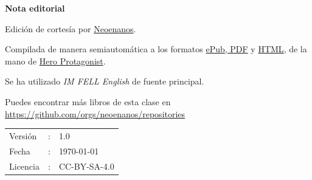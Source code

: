 \begin{center}
  {\LARGE\textbf{Nota editorial}}
\end{center}

\bigskip

Edición de cortesía por \href{https://github.com/orgs/neoenanos/}{Neoenanos}.

\medskip

Compilada de manera semiautomática a los formatos \href{https://github.com/neoenanos/elella/releases}{ePub, PDF} y \href{https://elella.netlify.app}{HTML}, de la mano de \href{https://heroprotagonist.is-a.dev/}{Hero Protagonist}.

\medskip

Se ha utilizado {\it IM FELL English} de fuente principal.

\medskip

Puedes encontrar más libros de esta clase en\\
\url{https://github.com/orgs/neoenanos/repositories}

\vfill

\begin{tabular}{l l l}
Versión   & : & 1.0 \\
Fecha     & : & \today \\
Licencia  & : & CC-BY-SA-4.0 \\
\end{tabular}

\bigskip

